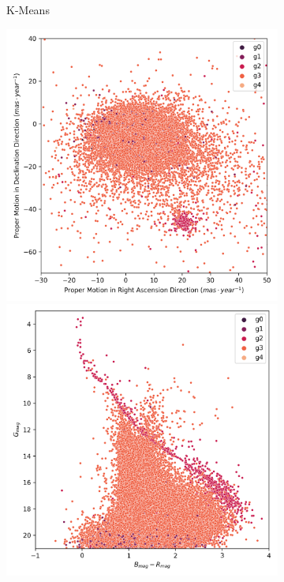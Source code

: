 \documentclass[11pt,a4paper,english,twocolumn]{article}
\begin{document}
\begin{figure}[!htbp]
\begin{subfigure}[b]{0.3\textwidth}
      \caption{K-Means}
  \end{subfigure}
  \medskip
  \begin{subfigure}[b]{0.3\textwidth}
    \centering
      \includegraphics[width=\textwidth]{../figures/melotte_22/dec_pm_melotte_22.png}
      \includegraphics[width=\textwidth]{../figures/melotte_22/dec_hr_diagram_melotte_22.png}

\end{subfigure}
\end{figure}
\end{document}
